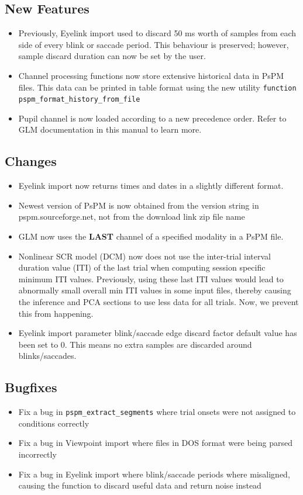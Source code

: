 \documentclass[english]{article}
\numberwithin{equation}{section}
\numberwithin{figure}{section}
\begin{document}
\subsection*{New Features}
\begin{itemize}
\item Previously, Eyelink import used to discard 50 ms worth of samples
from each side of every blink or saccade period. This behaviour is
preserved; however, sample discard duration can now be set by the
user.
\item Channel processing functions now store extensive historical data in
PsPM files. This data can be printed in table format using the new
utility \texttt{function pspm\_format\_history\_from\_file}
\item Pupil channel is now loaded according to a new precedence order. Refer
to GLM documentation in this manual to learn more.
\end{itemize}

\subsection*{Changes}
\begin{itemize}
\item Eyelink import now returns times and dates in a slightly different
format.
\item Newest version of PsPM is now obtained from the version string in
pspm.sourceforge.net, not from the download link zip file name
\item GLM now uses the \textbf{LAST} channel of a specified modality in
a PsPM file.
\item Nonlinear SCR model (DCM) now does not use the inter-trial interval
duration value (ITI) of the last trial when computing session specific
minimum ITI values. Previously, using these last ITI values would
lead to abnormally small overall min ITI values in some input files,
thereby causing the inference and PCA sections to use less data for
all trials. Now, we prevent this from happening.
\item Eyelink import parameter blink/saccade edge discard factor default
value has been set to 0. This means no extra samples are discarded
around blinks/saccades.
\end{itemize}

\subsection*{Bugfixes}
\begin{itemize}
\item Fix a bug in \texttt{pspm\_extract\_segments} where trial onsets were
not assigned to conditions correctly
\item Fix a bug in Viewpoint import where files in DOS format were being
parsed incorrectly
\item Fix a bug in Eyelink import where blink/saccade periods where misaligned,
causing the function to discard useful data and return noise instead
\end{itemize}
\end{document}
